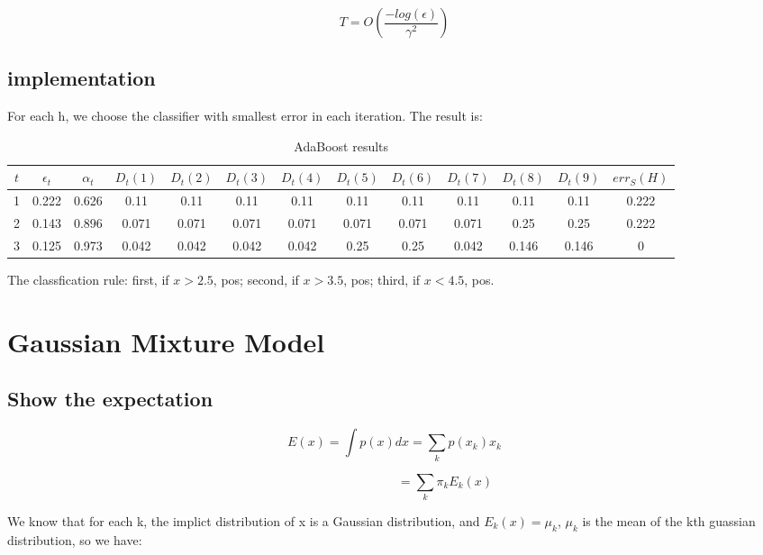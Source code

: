\documentclass{article} %
\begin{document}
\begin{equation}
T = O (\frac{-log (\epsilon)}{\gamma^2})
\end{equation}


\subsection{implementation}
For each h, we choose the classifier with smallest error in each
iteration. The result is:

\begin{table}[h]
\renewcommand{\arraystretch}{1.5}
\centering
\begin{tabular}{|c|c|c|c|c|c|c|c|c|c|c|c|c|}
\hline 
$ t $ 
& $ \epsilon_t $ 
& $ \alpha_t $ 
& $ D_t(1) $ 
& $ D_t(2) $ 
& $ D_t(3) $
& $ D_t(4) $
& $ D_t(5) $
& $ D_t(6) $
& $ D_t(7) $
& $ D_t(8) $
& $ D_t(9) $ 
& $ err_S(H) $ \\
\hline 
1 &0.222 &0.626 &0.11 &0.11 &0.11 &0.11 &0.11
&0.11 &0.11 &0.11 &0.11 &0.222 \\
\hline 
2 &0.143 &0.896 &0.071 &0.071 &0.071 &0.071 &0.071
&0.071 &0.071 &0.25 &0.25 &0.222 \\
\hline 
3 &0.125 &0.973 &0.042 &0.042 &0.042 &0.042 &0.25
&0.25 &0.042 &0.146 &0.146 &0 \\
\hline 
\end{tabular}
\caption{AdaBoost results}
\label{tbl:boost}
\end{table}

The classfication rule: first, if $x > 2.5$, pos; second, if $x > 3.5$,
pos; third, if $x < 4.5$, pos.



\section{Gaussian Mixture Model}


\subsection{Show the expectation}
\begin{equation}
E (x) = \int p(x) dx = \sum_k p(x_k) x_k
\end{equation}

\begin{equation}
\qquad \qquad \qquad \qquad
= \sum_k \pi_k E_k (x)
\end{equation}

We know that for each k, the implict distribution of x is a Gaussian
distribution, and $E_k (x) = \mu_k$, $\mu_k$ is the mean of the kth guassian
distribution, so we have:
\end{document}
